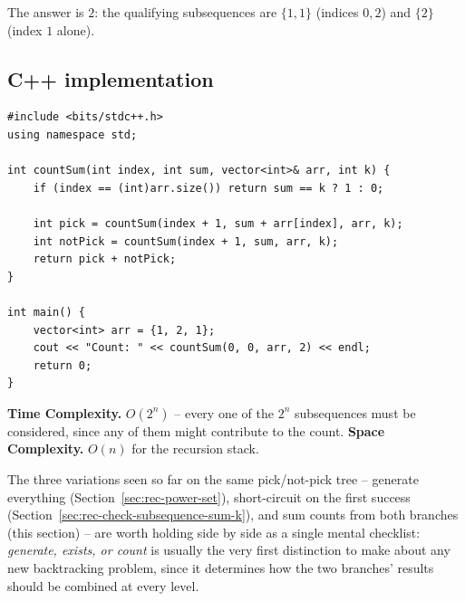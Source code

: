 The answer is $2$: the qualifying subsequences are $\{1,1\}$ (indices
$0,2$) and $\{2\}$ (index $1$ alone).

\subsection*{C++ implementation}

\begin{lstlisting}
#include <bits/stdc++.h>
using namespace std;

int countSum(int index, int sum, vector<int>& arr, int k) {
    if (index == (int)arr.size()) return sum == k ? 1 : 0;

    int pick = countSum(index + 1, sum + arr[index], arr, k);
    int notPick = countSum(index + 1, sum, arr, k);
    return pick + notPick;
}

int main() {
    vector<int> arr = {1, 2, 1};
    cout << "Count: " << countSum(0, 0, arr, 2) << endl;
    return 0;
}
\end{lstlisting}

\begin{complexitybox}
\textbf{Time Complexity.} $O(2^n)$ -- every one of the $2^n$
subsequences must be considered, since any of them might contribute to
the count.
\textbf{Space Complexity.} $O(n)$ for the recursion stack.
\end{complexitybox}

\begin{takeawaybox}
The three variations seen so far on the same pick/not-pick tree --
generate everything (Section~\ref{sec:rec-power-set}), short-circuit on
the first success (Section~\ref{sec:rec-check-subsequence-sum-k}), and
sum counts from both branches (this section) -- are worth holding side by
side as a single mental checklist: \emph{generate, exists, or count} is
usually the very first distinction to make about any new backtracking
problem, since it determines how the two branches' results should be
combined at every level.
\end{takeawaybox}
